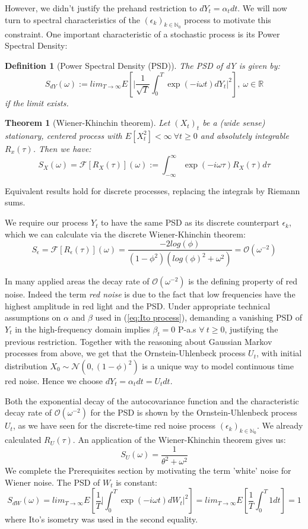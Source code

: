 \documentclass[%
thesis=student,%
coverpage=false,%
titlepage=false,%
headmarks=true, %
english,%
font=libertine, %
math=newpxtx, %
BCOR=5mm,%
coverBCOR=11mm%
]{tumbook}
\newtheorem{definition}{Definition}[section]
\newtheorem{theorem}{Theorem}
\begin{document}
However, we didn't justify the prehand restriction to $dY_{t} = \alpha_{t} dt$. We will now turn to spectral characteristics of the $(\epsilon_{k})_{k\in\mathbb{N}_{0}}$ process to motivate this constraint. One important characteristic of a stochastic process is its Power Spectral Density:


\begin{definition}[Power Spectral Density (PSD)]
The PSD of dY is given by:
\[
S_{dY}(\omega) := lim_{T\rightarrow\infty}E[\lvert \frac{1}{\sqrt{T}}\int_{0}^{T}\exp(-i\omega t)dY_{t}\rvert^{2}], \ \omega \in \mathbb{R}
\]
if the limit exists.
\end{definition}

\begin{theorem}[Wiener-Khinchin theorem]
Let $(X_{t})_{t}$ be a (wide sense) stationary, centered process with $E[X_{t}^2]<\infty \ \forall t \geq 0$ and absolutely integrable $R_{x}(\tau)$. Then we have:
\[
S_{X}(\omega) = \mathcal{F}[R_{X}(\tau)](\omega) := \int_{-\infty}^{\infty}\exp(-i\omega\tau)R_{X}(\tau)d\tau
\]
\end{theorem}

Equivalent results hold for discrete processes, replacing the integrals by Riemann sums.

We require our process $Y_{t}$ to have the same PSD as its discrete counterpart $\epsilon_{k}$, which we can calculate via the discrete Wiener-Khinchin theorem:
\[
S_{\epsilon} = \mathcal{F}[R_{\epsilon}(\tau)](\omega) = \frac{-2log(\phi)}{(1-\phi^{2})(log(\phi)^{2}+\omega^{2})} = \mathcal{O}(\omega^{-2})
\]

In many applied areas the decay rate of $\mathcal{O}(\omega^{-2})$ is the defining property of red noise. Indeed the term \textit{red noise} is due to the fact that low frequencies have the highest amplitude in red light and the PSD. 
Under appropriate technical assumptions on $\alpha$ and $\beta$ used in (\ref{eq:Ito process}), demanding a vanishing PSD of $Y_{t}$ in the high-frequency domain implies $\beta_{t} = 0$ P-a.s $\forall \ t \geq 0$, justifying the previous restriction. Together with the reasoning about Gaussian Markov processes from above, we get that the Ornstein-Uhlenbeck process $U_{t}$, with initial distribution $X_{0} \sim \mathcal{N}(0,(1-\phi)^2)$ is a unique way to model continuous time red noise. Hence we choose $dY_{t} = \alpha_{t}dt = U_{t}dt$. 

Both the exponential decay of the autocovariance function and the characteristic decay rate of $\mathcal{O}(\omega^{-2})$ for the PSD is shown by the Ornstein-Uhlenbeck process $U_{t}$, as we have seen for the discrete-time red noise process $(\epsilon_{k})_{k\in\mathbb{N}_{0}}$. We already calculated $R_{U}(\tau)$. 
An application of the Wiener-Khinchin theorem gives us: 
\[
    S_{U}(\omega) = \frac{1}{\theta^{2} + \omega^{2}}
\]
We complete the Prerequisites section by motivating the term 'white' noise for Wiener noise. The PSD of $W_{t}$ is constant:
\[
S_{dW}(\omega) =  lim_{T\rightarrow\infty}E[\frac{1}{T}\lvert\int_{0}^{T}\exp(-i\omega t)dW_{t}\rvert^{2}] = lim_{T\rightarrow \infty}E[\frac{1}{T}\int_{0}^{T}1dt] = 1
\]
where Ito's isometry was used in the second equality.
\end{document}
